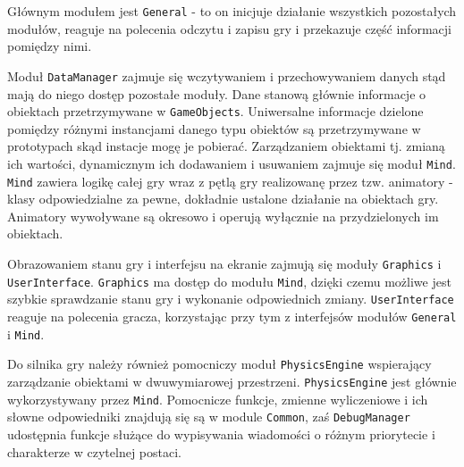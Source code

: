 \documentclass[licencjacka]{pracamgr}
\begin{document}
    Głównym modułem jest \texttt{General} - to on inicjuje działanie wszystkich pozostałych modułów, reaguje na
    polecenia odczytu i zapisu gry i przekazuje część informacji pomiędzy nimi.

    Moduł \texttt{DataManager} zajmuje się
    wczytywaniem i przechowywaniem danych stąd mają do niego dostęp pozostałe moduły. Dane stanową głównie informacje
    o obiektach przetrzymywane w \texttt{GameObjects}. Uniwersalne informacje dzielone pomiędzy różnymi instancjami danego
    typu obiektów są przetrzymywane w prototypach skąd instacje mogę je pobierać. Zarządzaniem obiektami tj. zmianą ich wartości,
    dynamicznym ich dodawaniem i usuwaniem zajmuje się moduł \texttt{Mind}. \texttt{Mind} zawiera logikę całej gry wraz z pętlą gry
    realizowanę przez tzw. animatory - klasy odpowiedzialne za pewne, dokładnie ustalone działanie na obiektach gry.
    Animatory wywoływane są okresowo i operują wyłącznie na przydzielonych im obiektach.

    Obrazowaniem stanu gry i interfejsu na ekranie zajmują się moduły \texttt{Graphics} i \texttt{UserInterface}.
    \texttt{Graphics} ma dostęp do modułu \texttt{Mind}, dzięki czemu możliwe jest szybkie sprawdzanie stanu
    gry i wykonanie odpowiednich zmiany. \texttt{UserInterface} reaguje na polecenia gracza, korzystając przy tym z interfejsów modułów
    \texttt{General} i \texttt{Mind}.

    Do silnika gry należy również pomocniczy moduł \texttt{PhysicsEngine} wspierający zarządzanie obiektami w dwuwymiarowej przestrzeni.
    \texttt{PhysicsEngine} jest głównie wykorzystywany przez \texttt{Mind}. Pomocnicze funkcje, zmienne wyliczeniowe i ich słowne 
    odpowiedniki znajdują się są w module \texttt{Common}, zaś \texttt{DebugManager} udostępnia funkcje służące do wypisywania wiadomości
    o różnym priorytecie i charakterze w czytelnej postaci.
\end{document}
